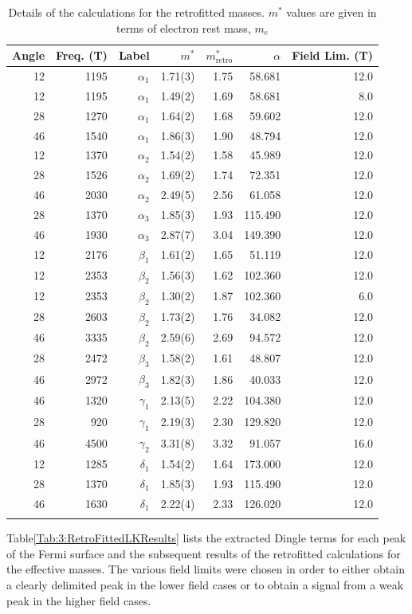 \begin{table}
    \begin{center}
        \caption{Details of the calculations for the retrofitted masses. $m^*$ values are given in terms of electron rest mass, $m_e$}
{\small
        \begin{tabular}[htbp]{rrrrrrr}
\toprule
Angle	& Freq. (\unit[]{T})	& Label & $m^*$ & $m^*_{\textrm{retro}}$	& $\alpha$	& Field Lim. (\unit[]{T}) \\
\midrule
12	 & 1195	 & $\alpha_1$	 & 1.71(3)	& 1.75	& 58.681	& 12.0\\
12	 & 1195	 & $\alpha_1$	 & 1.49(2)	& 1.69	& 58.681	& 8.0\\
28	 & 1270	 & $\alpha_1$	 & 1.64(2)	& 1.68	& 59.602	& 12.0\\
46	 & 1540	 & $\alpha_1$	 & 1.86(3)	& 1.90	& 48.794	& 12.0\\
12	 & 1370	 & $\alpha_2$	 & 1.54(2)	& 1.58	& 45.989	& 12.0\\
28	 & 1526	 & $\alpha_2$	 & 1.69(2)	& 1.74	& 72.351	& 12.0\\
46	 & 2030	 & $\alpha_2$	 & 2.49(5)	& 2.56	& 61.058	& 12.0\\
28	 & 1370	 & $\alpha_3$	 & 1.85(3)	& 1.93	& 115.490	& 12.0\\
46	 & 1930	 & $\alpha_3$	 & 2.87(7)	& 3.04	& 149.390	& 12.0\\
12	 & 2176	 & $\beta_1$	 & 1.61(2)	& 1.65	& 51.119	& 12.0\\
12	 & 2353	 & $\beta_2$	 & 1.56(3)	& 1.62	& 102.360	& 12.0\\
12	 & 2353	 & $\beta_2$	 & 1.30(2)	& 1.87	& 102.360	& 6.0\\
28	 & 2603	 & $\beta_2$	 & 1.73(2)	& 1.76	& 34.082	& 12.0\\
46	 & 3335	 & $\beta_2$	 & 2.59(6)	& 2.69	& 94.572	& 12.0\\
28	 & 2472	 & $\beta_3$	 & 1.58(2)	& 1.61	& 48.807	& 12.0\\
46	 & 2972	 & $\beta_3$	 & 1.82(3)	& 1.86	& 40.033	& 12.0\\
46	 & 1320	 & $\gamma_1$	 & 2.13(5)	& 2.22	& 104.380	& 12.0\\
28	 & 920	 & $\gamma_1$	 & 2.19(3)	& 2.30	& 129.820	& 12.0\\
46	 & 4500	 & $\gamma_2$	 & 3.31(8)	& 3.32	& 91.057	& 16.0\\
12	 & 1285	 & $\delta_1$	 & 1.54(2)	& 1.64	& 173.000	& 12.0\\
28	 & 1370	 & $\delta_1$	 & 1.85(3)	& 1.93	& 115.490	& 12.0\\
46	 & 1630	 & $\delta_1$	 & 2.22(4)	& 2.33	& 126.020	& 12.0\\
\bottomrule
        \label{Table:3:RetroFittedLKResults}
        \end{tabular}
}
    \end{center}
\end{table}
Table\ref{Tab:3:RetroFittedLKResults} lists the extracted Dingle terms for each peak of the Fermi surface and the subsequent results of the retrofitted calculations for the effective masses. The various field limits were chosen in order to either obtain a clearly delimited peak in the lower field cases or to obtain a signal from a weak peak in the higher field cases.


